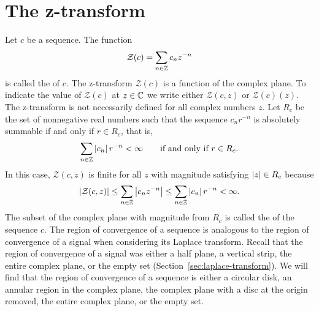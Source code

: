 

\section{The z-transform}

\newcommand{\calZ}{{\mathcal Z}}

Let $c$ be a sequence.  The function
\[
\calZ(c) = \sum_{n \in \ints} c_n z^{-n}
\]
is called the  of $c$. The z-transform $\calZ(c)$ is a function of the complex plane. To indicate the value of $\calZ(c)$ at $z \in {\mathbb C}$ we write either $\calZ(c,z)$ or $\calZ(c)(z)$.  The z-transform is not necessarily defined for all complex numbers $z$.  Let $R_c$ be the set of nonnegative real numbers such that the sequence $c_n r^{-n}$ is absolutely summable if and only if $r \in R_c$, that is,
\[
\sum_{n \in {\mathbb Z}} \left\vert c_n \right\vert r^{-n} < \infty \qquad \text{if and only if $r \in R_c$}.
\]
In this case, $\calZ(c,z)$ is finite for all $z$ with magnitude satisfying $\left\vert z \right\vert \in R_c$ because 
\[
\sabs{\calZ(c,z)} \leq \sum_{n \in \ints} \abs{c_n z^{-n}} \leq \sum_{n \in \ints} \abs{c_n} r^{-n} < \infty.
\]
The subset of the complex plane with magnitude from $R_c$ is called the  of the sequence $c$.  The region of convergence of a sequence is analogous to the region of convergence of a signal when considering its Laplace transform.  Recall that the region of convergence of a signal was either a half plane, a vertical strip, the entire complex plane, or the empty set (Section~\ref{sec:laplace-transform}).  We will find that the region of convergence of a sequence is either a circular disk, an annular region in the complex plane, the complex plane with a disc at the origin removed, the entire complex plane, or the empty set.

